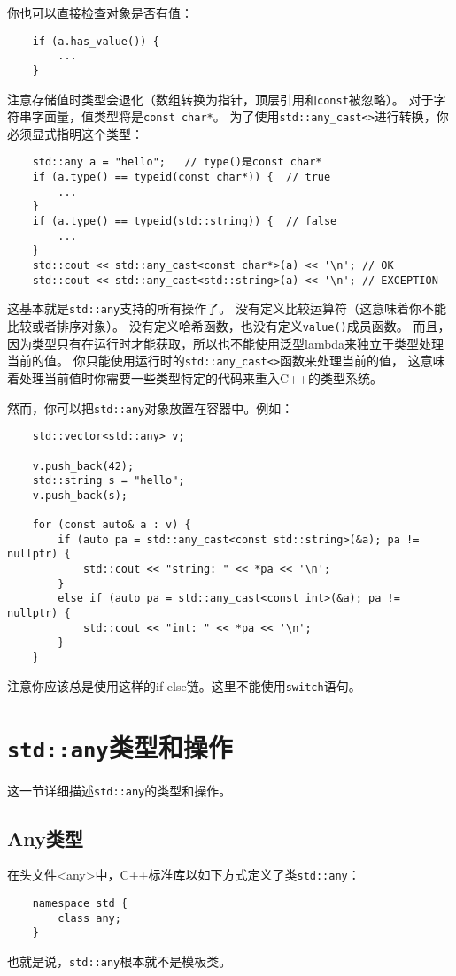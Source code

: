 你也可以直接检查对象是否有值：
\begin{lstlisting}
    if (a.has_value()) {
        ...
    }
\end{lstlisting}
注意存储值时类型会退化（数组转换为指针，顶层引用和\texttt{const}被忽略）。
对于字符串字面量，值类型将是\texttt{const char*}。
为了使用\texttt{std::any\_cast<>}进行转换，你必须显式指明这个类型：
\begin{lstlisting}
    std::any a = "hello";   // type()是const char*
    if (a.type() == typeid(const char*)) {  // true
        ...
    }
    if (a.type() == typeid(std::string)) {  // false
        ...
    }
    std::cout << std::any_cast<const char*>(a) << '\n'; // OK
    std::cout << std::any_cast<std::string>(a) << '\n'; // EXCEPTION
\end{lstlisting}
这基本就是\texttt{std::any}支持的所有操作了。
没有定义比较运算符（这意味着你不能比较或者排序对象）。
没有定义哈希函数，也没有定义\texttt{value()}成员函数。
而且，因为类型只有在运行时才能获取，所以也不能使用泛型lambda来独立于类型处理当前的值。
你只能使用运行时的\texttt{std::any\_cast<>}函数来处理当前的值，
这意味着处理当前值时你需要一些类型特定的代码来重入C++的类型系统。

然而，你可以把\texttt{std::any}对象放置在容器中。例如：
\begin{lstlisting}
    std::vector<std::any> v;

    v.push_back(42);
    std::string s = "hello";
    v.push_back(s);

    for (const auto& a : v) {
        if (auto pa = std::any_cast<const std::string>(&a); pa != nullptr) {
            std::cout << "string: " << *pa << '\n';
        }
        else if (auto pa = std::any_cast<const int>(&a); pa != nullptr) {
            std::cout << "int: " << *pa << '\n';
        }
    }
\end{lstlisting}
注意你应该总是使用这样的if-else链。这里不能使用\texttt{switch}语句。


\section{\texttt{std::any}类型和操作}
这一节详细描述\texttt{std::any}的类型和操作。

\subsection{Any类型}
在头文件<any>中，C++标准库以如下方式定义了类\texttt{std::any}：
\begin{lstlisting}
    namespace std {
        class any;
    }
\end{lstlisting}
也就是说，\texttt{std::any}根本就不是模板类。

